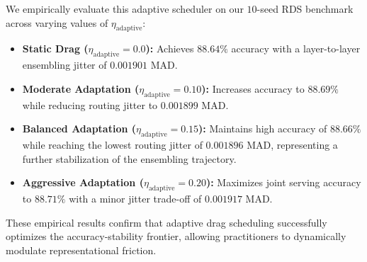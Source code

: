 We empirically evaluate this adaptive scheduler on our $10$-seed RDS benchmark across varying values of $\eta_{\text{adaptive}}$:
\begin{itemize}
    \item \textbf{Static Drag ($\eta_{\text{adaptive}} = 0.0$): } Achieves $88.64\%$ accuracy with a layer-to-layer ensembling jitter of $0.001901$ MAD.
    \item \textbf{Moderate Adaptation ($\eta_{\text{adaptive}} = 0.10$): } Increases accuracy to $88.69\%$ while reducing routing jitter to $0.001899$ MAD.
    \item \textbf{Balanced Adaptation ($\eta_{\text{adaptive}} = 0.15$): } Maintains high accuracy of $88.66\%$ while reaching the lowest routing jitter of $0.001896$ MAD, representing a further stabilization of the ensembling trajectory.
    \item \textbf{Aggressive Adaptation ($\eta_{\text{adaptive}} = 0.20$): } Maximizes joint serving accuracy to $88.71\%$ with a minor jitter trade-off of $0.001917$ MAD.
\end{itemize}
These empirical results confirm that adaptive drag scheduling successfully optimizes the accuracy-stability frontier, allowing practitioners to dynamically modulate representational friction.

